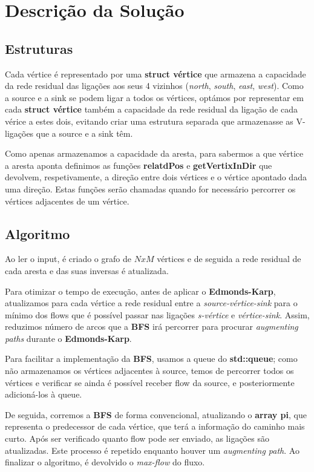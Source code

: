 \documentclass[12pt,a4paper]{article}
\begin{document}
\section{Descrição da Solução}
\subsection{Estruturas}
Cada vértice é representado por uma \textbf{struct vértice} que armazena a capacidade da rede residual das ligações aos seus
4 vizinhos (\textit{north}, \textit{south}, \textit{east}, \textit{west}). Como a source e a sink se podem ligar a todos os vértices,
optámos por representar
em cada \textbf{struct vértice} também a capacidade da rede residual da ligação de cada vérice a estes dois, evitando criar
uma estrutura separada que armazenasse as V-ligações que a source e a sink têm.

Como apenas armazenamos a capacidade da aresta, para sabermos a que vértice a aresta aponta definimos as funções
\textbf{relatdPos} e \textbf{getVertixInDir} que devolvem, respetivamente, a direção entre dois vértices e o vértice apontado
dada uma direção. Estas funções serão chamadas quando for necessário percorrer os vértices adjacentes de um vértice.

\subsection{Algoritmo}
Ao ler o input, é criado o grafo de $NxM$ vértices e de seguida a rede residual de cada aresta e das suas inversas é atualizada.

Para otimizar o tempo de execução, antes de aplicar o \textbf{Edmonds-Karp}, atualizamos para cada vértice a rede residual entre a
\textit{source-vértice-sink} para o mínimo dos flows que é possível passar nas ligações \textit{s-vértice} e \textit{vértice-sink}.
Assim, reduzimos número de arcos que a \textbf{BFS} irá percorrer para procurar \textit{augmenting paths} durante o \textbf{Edmonds-Karp}.

Para facilitar a implementação da \textbf{BFS}, usamos a queue do \textbf{std::queue}; como não armazenamos os vértices adjacentes à source,
temos de percorrer todos os vértices e verificar se ainda é possível receber flow da source, e posteriormente adicioná-los
à queue.

De seguida, corremos a \textbf{BFS} de forma convencional, atualizando o \textbf{array pi}, que representa o predecessor
de cada vértice, que terá a informação do caminho mais curto. Após ser verificado quanto flow pode ser enviado, as ligações
são atualizadas. Este processo é repetido enquanto houver um \textit{augmenting path}. Ao finalizar o algoritmo, é devolvido o \textit{max-flow} do fluxo.
\end{document}
